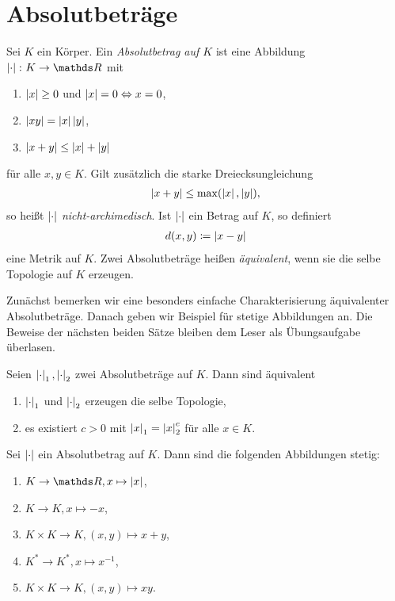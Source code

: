 \chapter{Absolutbeträge}
\begin{defi}
Sei $K$ ein Körper. Ein \emph{Absolutbetrag auf $K$} ist eine Abbildung $\abs{\cdot}\colon K \to \R$ mit
\begin{enumerate}[label=\roman*)]
\item $\left\vert x\right\vert\geq 0$ und $\left\vert x\right\vert=0 \Leftrightarrow x=0$,
\item $\left\vert xy\right\vert=\left\vert x\right\vert\left\vert y\right\vert$,
\item $\left\vert x+y\right\vert\leq \left\vert x\right\vert+\left\vert y\right\vert$
\end{enumerate}
für alle $x,y\in K$.
Gilt zusätzlich die starke Dreiecksungleichung
\begin{align*}
\left\vert x+y\right\vert\leq \max(\left\vert x\right\vert,\left\vert y\right\vert),
\end{align*}
so heißt $\left\vert\cdot\right\vert$ \emph{nicht-archimedisch}.
Ist $\left\vert\cdot\right\vert$ ein Betrag auf $K$, so definiert
\begin{align*}
d(x,y)\coloneqq \left\vert x-y\right\vert
\end{align*}
eine Metrik auf $K$.
Zwei Absolutbeträge heißen \emph{äquivalent}, wenn sie die selbe Topologie auf $K$ erzeugen.
\end{defi}

Zunächst bemerken wir eine besonders einfache Charakterisierung äquivalenter Absolutbeträge.
Danach geben wir Beispiel für stetige Abbildungen an.
Die Beweise der nächsten beiden Sätze bleiben dem Leser als Übungsaufgabe überlasen.


\begin{satz}
Seien $\left\vert\cdot\right\vert_1,\left\vert\cdot\right\vert_2$ zwei Absolutbeträge auf $K$.
Dann sind äquivalent
\begin{enumerate}[label=\roman*)]
\item $\left\vert\cdot\right\vert_1$ und $\left\vert\cdot\right\vert_2$ erzeugen die selbe Topologie,
\item es existiert $c>0$ mit $\left\vert x\right\vert_1=\left\vert x\right\vert_2^c$ für alle $x\in K$.
\end{enumerate}
\end{satz}

\begin{satz}
Sei $\left\vert\cdot\right\vert$ ein Absolutbetrag auf $K$. Dann sind die folgenden Abbildungen stetig:
\begin{enumerate}[label=\roman*)]
\item $K\to \R, x \mapsto \abs{x}$,
\item $K\to K, x\mapsto -x$,
\item $K \times K \to K, (x,y)\mapsto x+y$,
\item $K^\ast \to K^\ast, x \mapsto x^{-1}$,
\item $K \times K \to K, (x,y)\mapsto xy$.
\end{enumerate}
\end{satz}

